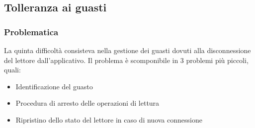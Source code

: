 \subsection{Tolleranza ai guasti}
\subsubsection*{Problematica}
La quinta difficoltà consisteva nella gestione dei guasti dovuti alla disconnessione del lettore dall'applicativo.
Il problema è scomponibile in 3 problemi più piccoli, quali:
\begin{itemize}
    \item Identificazione del guasto
    \item Procedura di arresto delle operazioni di lettura
    \item Ripristino dello stato del lettore in caso di nuova connessione
\end{itemize}

